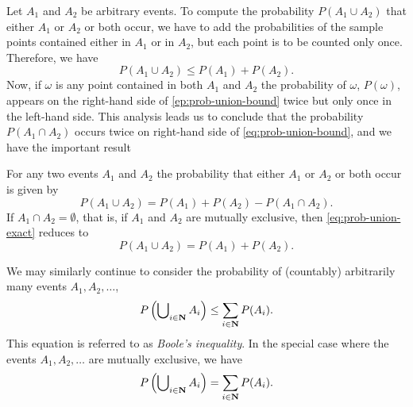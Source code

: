 Let \(A_1\) and \(A_2\) be arbitrary events. To compute the probability
\(P(A_1\cup A_2)\) that either \(A_1\) or \(A_2\) or both occur, we have to
add the probabilities of the sample points contained either in \(A_1\) or
in \(A_2\), but each point is to be counted only once. Therefore, we have
\begin{equation}
  \label{eq:prob-union-bound}
  P(A_1\cup A_2)\leq P(A_1)+P(A_2).
\end{equation}
Now, if \(\omega\) is any point contained in both \(A_1\) and \(A_2\) the
probability of \(\omega\), \(P(\omega)\), appears on the right-hand side of
\eqref{ep:prob-union-bound} twice but only once in the left-hand side. This
analysis leads us to conclude that the probability \(P(A_1\cap A_2)\)
occurs twice on right-hand side of \eqref{eq:prob-union-bound}, and we have
the important result
\begin{theorem}
  For any two events \(A_1\) and \(A_2\) the probability that either
  \(A_1\) or \(A_2\) or both occur is given by
  \begin{equation}
    \label{eq:prob-union-exact}
    P(A_1\cup A_2)=P(A_1)+P(A_2)-P(A_1\cap A_2).
  \end{equation}
  If \(A_1\cap A_2=\emptyset\), that is, if \(A_1\) and \(A_2\) are
  mutually exclusive, then \eqref{eq:prob-union-exact} reduces to
  \[
    P(A_1\cup A_2)=P(A_1)+P(A_2).
  \]
\end{theorem}

We may similarly continue to consider the probability of (countably)
arbitrarily many events \(A_1,A_2,\dotsc\),
\begin{equation}
  \label{eq:booles-inequality}
  P\left(\bigcup\nolimits_{i\in\mathbf{N}} A_i\right)\leq\sum_{i\in\mathbf{N}} P(A_i).
\end{equation}
This equation is referred to as \emph{Boole's inequality}. In the special
case where the events \(A_1,A_2,\dotsc\) are mutually exclusive, we have
\[
  P\left( \bigcup\nolimits_{i\in\mathbf{N}} A_i\right)=\sum_{i\in\mathbf{N}} P(A_i).
\]


